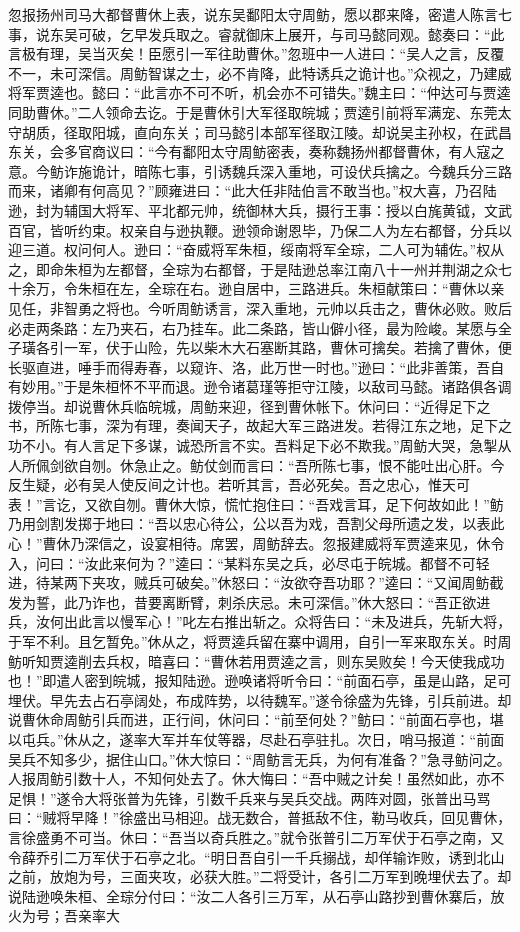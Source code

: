 忽报扬州司马大都督曹休上表，说东吴鄱阳太守周鲂，愿以郡来降，密遣人陈言七事，说东吴可破，乞早发兵取之。睿就御床上展开，与司马懿同观。懿奏曰：“此言极有理，吴当灭矣！臣愿引一军往助曹休。”忽班中一人进曰：“吴人之言，反覆不一，未可深信。周鲂智谋之士，必不肯降，此特诱兵之诡计也。”众视之，乃建威将军贾逵也。懿曰：“此言亦不可不听，机会亦不可错失。”魏主曰：“仲达可与贾逵同助曹休。”二人领命去讫。于是曹休引大军径取皖城；贾逵引前将军满宠、东莞太守胡质，径取阳城，直向东关；司马懿引本部军径取江陵。却说吴主孙权，在武昌东关，会多官商议曰：“今有鄱阳太守周鲂密表，奏称魏扬州都督曹休，有人寇之意。今鲂诈施诡计，暗陈七事，引诱魏兵深入重地，可设伏兵擒之。今魏兵分三路而来，诸卿有何高见？”顾雍进曰：“此大任非陆伯言不敢当也。”权大喜，乃召陆逊，封为辅国大将军、平北都元帅，统御林大兵，摄行王事：授以白旄黄钺，文武百官，皆听约束。权亲自与逊执鞭。逊领命谢恩毕，乃保二人为左右都督，分兵以迎三道。权问何人。逊曰：“奋威将军朱桓，绥南将军全琮，二人可为辅佐。”权从之，即命朱桓为左都督，全琮为右都督，于是陆逊总率江南八十一州并荆湖之众七十余万，令朱桓在左，全琮在右。逊自居中，三路进兵。朱桓献策曰：“曹休以亲见任，非智勇之将也。今听周鲂诱言，深入重地，元帅以兵击之，曹休必败。败后必走两条路：左乃夹石，右乃挂车。此二条路，皆山僻小径，最为险峻。某愿与全子璜各引一军，伏于山险，先以柴木大石塞断其路，曹休可擒矣。若擒了曹休，便长驱直进，唾手而得寿春，以窥许、洛，此万世一时也。”逊曰：“此非善策，吾自有妙用。”于是朱桓怀不平而退。逊令诸葛瑾等拒守江陵，以敌司马懿。诸路俱各调拨停当。却说曹休兵临皖城，周鲂来迎，径到曹休帐下。休问曰：“近得足下之书，所陈七事，深为有理，奏闻天子，故起大军三路进发。若得江东之地，足下之功不小。有人言足下多谋，诚恐所言不实。吾料足下必不欺我。”周鲂大哭，急掣从人所佩剑欲自刎。休急止之。鲂仗剑而言曰：“吾所陈七事，恨不能吐出心肝。今反生疑，必有吴人使反间之计也。若听其言，吾必死矣。吾之忠心，惟天可表！”言讫，又欲自刎。曹休大惊，慌忙抱住曰：“吾戏言耳，足下何故如此！”鲂乃用剑割发掷于地曰：“吾以忠心待公，公以吾为戏，吾割父母所遗之发，以表此心！”曹休乃深信之，设宴相待。席罢，周鲂辞去。忽报建威将军贾逵来见，休令入，问曰：“汝此来何为？”逵曰：“某料东吴之兵，必尽屯于皖城。都督不可轻进，待某两下夹攻，贼兵可破矣。”休怒曰：“汝欲夺吾功耶？”逵曰：“又闻周鲂截发为誓，此乃诈也，昔要离断臂，刺杀庆忌。未可深信。”休大怒曰：“吾正欲进兵，汝何出此言以慢军心！”叱左右推出斩之。众将告曰：“未及进兵，先斩大将，于军不利。且乞暂免。”休从之，将贾逵兵留在寨中调用，自引一军来取东关。时周鲂听知贾逵削去兵权，暗喜曰：“曹休若用贾逵之言，则东吴败矣！今天使我成功也！”即遣人密到皖城，报知陆逊。逊唤诸将听令曰：“前面石亭，虽是山路，足可埋伏。早先去占石亭阔处，布成阵势，以待魏军。”遂令徐盛为先锋，引兵前进。却说曹休命周鲂引兵而进，正行间，休问曰：“前至何处？”鲂曰：“前面石亭也，堪以屯兵。”休从之，遂率大军并车仗等器，尽赴石亭驻扎。次日，哨马报道：“前面吴兵不知多少，据住山口。”休大惊曰：“周鲂言无兵，为何有准备？”急寻鲂问之。人报周鲂引数十人，不知何处去了。休大悔曰：“吾中贼之计矣！虽然如此，亦不足惧！”遂令大将张普为先锋，引数千兵来与吴兵交战。两阵对圆，张普出马骂曰：“贼将早降！”徐盛出马相迎。战无数合，普抵敌不住，勒马收兵，回见曹休，言徐盛勇不可当。休曰：“吾当以奇兵胜之。”就令张普引二万军伏于石亭之南，又令薛乔引二万军伏于石亭之北。“明日吾自引一千兵搦战，却佯输诈败，诱到北山之前，放炮为号，三面夹攻，必获大胜。”二将受计，各引二万军到晚埋伏去了。却说陆逊唤朱桓、全琮分付曰：“汝二人各引三万军，从石亭山路抄到曹休寨后，放火为号；吾亲率大